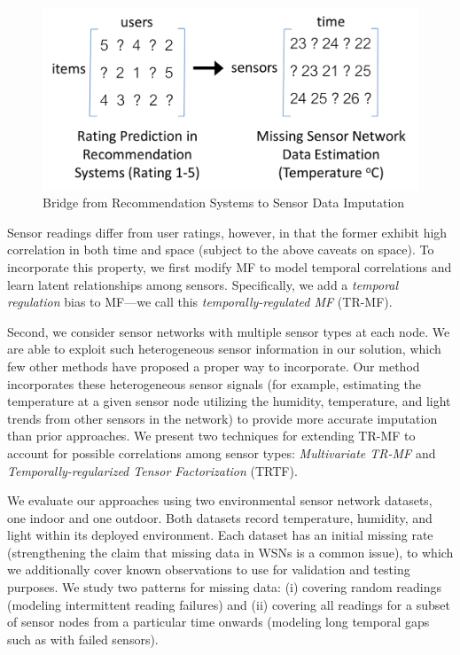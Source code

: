 \begin{figure}[H]
\centering
\includegraphics[scale=0.35]{recommend_imputation.png}
\caption{Bridge from Recommendation Systems to Sensor Data Imputation} 
\label{recommend_imputation}
\end{figure}

Sensor readings differ from user ratings, however, in that the former
exhibit high correlation in both time and space (subject to the above
caveats on space).  To incorporate this property, we first modify MF
to model temporal correlations and learn latent relationships among
sensors.  Specifically, we add a {\em temporal regulation} bias to
MF---we call this {\em temporally-regulated MF} (TR-MF).

Second, we consider sensor networks with multiple sensor types at each node.
We are able to exploit such heterogeneous sensor information in our
solution, which few other methods have proposed a proper way to
incorporate.  Our method incorporates these heterogeneous sensor
signals (for example, estimating the temperature at a given sensor
node utilizing the humidity, temperature, and light trends from other
sensors in the network) to provide more accurate imputation than 
prior approaches.  We present two techniques for extending 
TR-MF to account for possible correlations among sensor types: {\em Multivariate TR-MF} and 
{\em Temporally-regularized Tensor Factorization} (TRTF).

We evaluate our approaches using two environmental sensor network
datasets, one indoor and one outdoor.
Both datasets record temperature, humidity, and light within its deployed
environment.  Each dataset has an initial missing rate (strengthening
the claim that missing data in WSNs is a common issue), to which we
additionally cover known observations to use for validation and
testing purposes.  We study two patterns for missing data: (i) covering
random readings (modeling intermittent reading failures) and (ii)
covering all readings for a subset of sensor nodes from a particular time onwards 
(modeling long temporal gaps such as with failed sensors).


